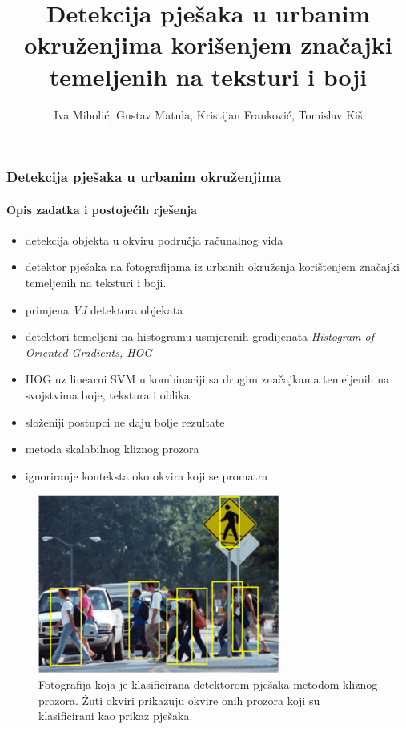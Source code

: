 \documentclass{beamer}
\title{Detekcija pješaka u urbanim okruženjima korišenjem značajki temeljenih na teksturi i boji}
\author{Iva Miholić, Gustav Matula, Kristijan Franković, Tomislav Kiš}
\begin{document}
\begin{frame}
\maketitle
\end{frame}

\begin{frame}
\frametitle{Detekcija pješaka u urbanim okruženjima}
\framesubtitle{Opis zadatka i postojećih rješenja}
\begin{itemize}
\item detekcija objekta u okviru područja računalnog vida
\item detektor pješaka na fotografijama iz urbanih okruženja korištenjem značajki temeljenih na teksturi i boji.
\end{itemize}
\end{frame}

\begin{frame}
\begin{itemize}
\item primjena \emph{VJ} detektora objekata
\item detektori temeljeni na histogramu usmjerenih gradijenata \emph{Histogram of Oriented Gradients, HOG}
\item HOG uz linearni SVM u kombinaciji sa drugim značajkama temeljenih na svojstvima boje, tekstura i oblika
\item složeniji postupci ne daju bolje rezultate
\end{itemize}
\end{frame}

\begin{frame}
\begin{itemize}
\item metoda skalabilnog kliznog prozora
\item ignoriranje konteksta oko okvira koji se promatra 
\end{itemize}
\begin{figure}
\center
\includegraphics[scale=0.7]{img/crossing.png}
\caption{Fotografija koja je klasificirana detektorom pješaka metodom kliznog prozora. Žuti okviri prikazuju okvire onih prozora koji su klasificirani kao prikaz pješaka.}
\label{primjer_klasifikacije}
\end{figure}
\end{frame}
\end{document}
